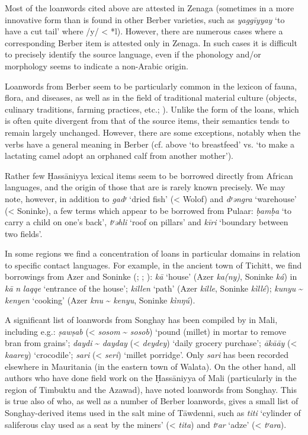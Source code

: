 \documentclass[output=paper]{langsci/langscibook}
\begin{document}
Most of the loanwords cited above are attested in Zenaga (sometimes in a more innovative form than is found in other Berber varieties, such as \textit{yaggīyyay} ‘to have a cut tail’ where /y/ < *l). However, there are numerous cases where a corresponding Berber item is attested only in Zenaga. In such cases it is difficult to precisely identify the source language, even if the phonology and/or morphology seems to indicate a non-Arabic origin. 

Loanwords from Berber seem to be particularly common in the lexicon of fauna, flora, and diseases, as well as in the field of traditional material culture (objects, culinary traditions, farming practices, etc.; \citealt{Taine-Cheikh2010lexiques,Taine-Cheikh2014}). Unlike the form of the loans, which is often quite divergent from that of the source items, their semantics tends to remain largely unchanged. However, there are some exceptions, notably when the verbs have a general meaning in Berber (cf. above `to breastfeed' vs. `to make a lactating camel adopt an orphaned calf from another mother'). 


Rather few Ḥassāniyya lexical items seem to be borrowed directly from African languages, and the origin of those that are is rarely known precisely. We may note, however, in addition to \textit{gadʸ} ‘dried fish’ (< Wolof) and \textit{dʸəngra} ‘warehouse’ (< Soninke), a few terms which appear to be borrowed from Pulaar: \textit{ḅamḅa} ‘to carry a child on one’s back’, \textit{tʸəhli} ‘roof on pillars’ and \textit{kīri} ‘boundary between two fields’.

In some regions we find a concentration of loans in particular domains in relation to specific contact languages. For example, in the ancient town of Tichitt, we find borrowings from Azer and Soninke (\citealt{Jacques-Meunié1961}; \citealt{Monteil1939}; \citealt{Diagana2013}): \textit{kā} ‘house’ (Azer \textit{ka(ny)}, Soninke \textit{ká}) in \textit{kā} \textit{n} \textit{laqqe} ‘entrance of the house’; \textit{killen} ‘path’ (Azer \textit{kille}, Soninke \textit{kìllé}); \textit{kunyu} \~{} \textit{kenyen} ‘cooking’ (Azer \textit{knu} \~{} \textit{kenyu}, Soninke \textit{kìnŋú}).

A significant list of loanwords from Songhay has been compiled by \citet{Heath2004} in Mali, including e.g.: \textit{ṣawṣab} (< \textit{sosom} \~{} \textit{sosob}) ‘pound (millet) in mortar to remove bran from grains’; \textit{daydi} \~{} \textit{dayday} (< \textit{deydey}) ‘daily grocery purchase’; \textit{ākā{\R}āy} (< \textit{kaarey}) ‘crocodile’; \textit{sari} (< \textit{seri}) ‘millet porridge’. Only \textit{sari} has been recorded elsewhere in Mauritania (in the eastern town of Walata). On the other hand, all authors who have done field work on the Ḥassāniyya of Mali (particularly in the region of Timbuktu and the Azawad), have noted loanwords from Songhay. This is true also of \citet{Clauzel1960} who, as well as a number of Berber loanwords, gives a small list of Songhay-derived items used in the salt mine of Tāwdenni, such as \textit{titi} ‘cylinder of saliferous clay used as a seat by the miners’ (< \textit{tita}) and \textit{tʸar} ‘adze’ (< \textit{tʸara}).
\end{document}
